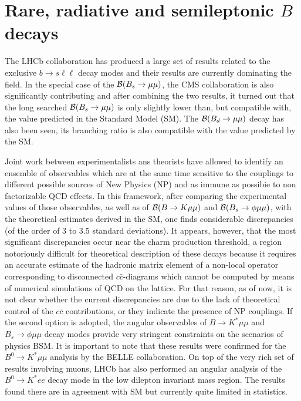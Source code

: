 \section{Rare, radiative and semileptonic $B$ decays}

The LHCb collaboration has produced a large set of results related to the exclusive $b \to s\ell \ell $ decay modes and their results are currently dominating the field. 
In the special case of the ${\cal B}(B_s\rightarrow \mu\mu)$, the CMS collaboration is also significantly contributing and after combining the two results, 
it turned out that the long searched ${\cal B}(B_s\rightarrow \mu\mu)$ is only slightly lower than, but compatible with, the value
predicted in the Standard Model (SM). The ${\cal B}(B_d\rightarrow \mu\mu)$ decay has also been seen, its branching ratio is also compatible with the value predicted by the SM. 

\par
Joint work between experimentalists ans theorists have allowed to identify an ensemble of observables which are
at the same time sensitive to the couplings to different possible sources of New Physics (NP) and as immune as possibie to non factorizable QCD effects. 
In this framework, after comparing the experimental values of those observables, as well as of ${\cal B}(B\rightarrow K \mu\mu)$ and ${\cal B}(B_s\rightarrow \phi \mu\mu)$, with the theoretical estimates derived in the SM, 
one finds considerable discrepancies (of the order of 3 to 3.5 standard deviations). 
It appears, however, that the most significant discrepancies occur near the charm production threshold, a region notoriously difficult for theoretical 
description of these decays because it requires an accurate estimate of the hadronic matrix element of a non-local operator corresponding to disconnected $c\bar c$-diagrams which 
cannot be computed by means of numerical simulations of QCD on the lattice. For that reason, as of now, it is not clear whether the current discrepancies are due to the lack of theoretical 
control of the $c\bar c$ contributions, or they indicate the presence of NP couplings. If the second option is adopted, the angular observables of $B\to K^\ast \mu\mu$ and $B_s\to \phi \mu\mu$ 
decay modes provide very stringent constraints on the scenarios of physics BSM. It is important to note that these results were confirmed for the $B^0\to K^\ast \mu\mu$  analysis by the BELLE collaboration. 
On top of the very rich set of results involving muons, LHCb has also performed an angular analysis  of the $B^0\to K^\ast e e $ decay mode in the low dilepton invariant mass region. The results found there are in agreement with SM but currently quite limited in statistics.  

